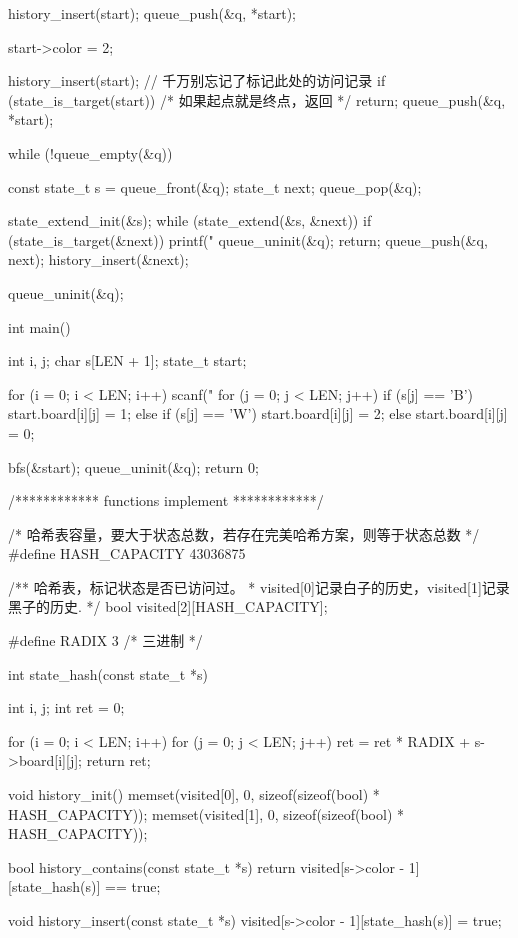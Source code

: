 \begin{Codex}[label=four_adjacent.c]
{    history_insert(start);
    queue_push(&q, *start);

    start->color = 2;

    history_insert(start); // 千万别忘记了标记此处的访问记录
    if (state_is_target(start)) /* 如果起点就是终点，返回 */
        return;
    queue_push(&q, *start);

    while (!queue_empty(&q)) {
        const state_t s = queue_front(&q);
        state_t next;
        queue_pop(&q);

        state_extend_init(&s);
        while (state_extend(&s, &next)) {
            if (state_is_target(&next)) {
                printf("%
                queue_uninit(&q);
                return;
            }
            queue_push(&q, next);
            history_insert(&next);
        }
    }
    queue_uninit(&q);
}

int main() {
    int i, j;
    char s[LEN + 1];
    state_t start;

    for (i = 0; i < LEN; i++) {
        scanf("%
        for (j = 0; j < LEN; j++) {
            if (s[j] == 'B') start.board[i][j] = 1;
            else if (s[j] == 'W') start.board[i][j] = 2;
            else start.board[i][j] = 0;
        }
    }

    bfs(&start);
    queue_uninit(&q);
    return 0;
}

/************ functions implement ************/

/* 哈希表容量，要大于状态总数，若存在完美哈希方案，则等于状态总数 */
#define HASH_CAPACITY 43036875

/** 哈希表，标记状态是否已访问过。
 * visited[0]记录白子的历史，visited[1]记录黑子的历史.
 */
bool visited[2][HASH_CAPACITY];

#define RADIX 3 /* 三进制 */

int state_hash(const state_t *s) {
    int i, j;
    int ret = 0;

    for (i = 0; i < LEN; i++) {
        for (j = 0; j < LEN; j++) {
            ret = ret * RADIX + s->board[i][j];
        }
    }
    return ret;
}

void history_init() {
    memset(visited[0], 0, sizeof(sizeof(bool) * HASH_CAPACITY));
    memset(visited[1], 0, sizeof(sizeof(bool) * HASH_CAPACITY));
}

bool history_contains(const state_t *s) {
    return visited[s->color - 1][state_hash(s)] == true;
}

void history_insert(const state_t *s) {
    visited[s->color - 1][state_hash(s)] = true;
}


\end{Codex}
